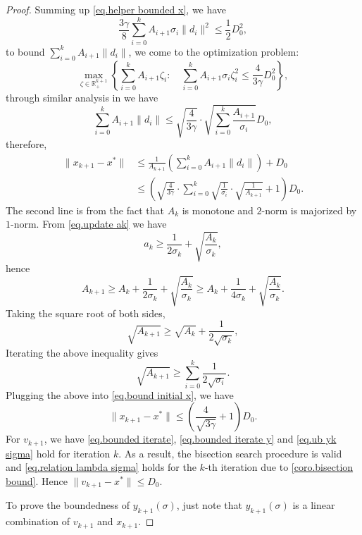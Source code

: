 \documentclass{article}
\begin{document}
\begin{proof}
    Summing up \eqref{eq.helper bounded x}, we have
    \begin{equation*}
        \frac{3\gamma}{8}\sum_{i=0}^k A_{i+1}\sigma_i \|d_i\|^2 \leq \frac{1}{2}D_0^2,
    \end{equation*}
    to bound $\sum_{i=0}^k A_{i+1}\|d_i\|$, we come to the optimization problem:
    \begin{equation*}
        \max _{\zeta \in \mathbb{R}^{k+1}_+}\left\{\sum_{i=0}^{k} A_{i+1}\zeta_i: \quad \sum_{i=0}^{k} A_{i+1} \sigma_i\zeta_i^2 \leq \frac{4}{3\gamma}D_0^2\right\},
    \end{equation*}
    through similar analysis in \citet[Lemma A.2]{monteiro2013accelerated} we have
    \begin{equation*}
        \sum_{i=0}^k A_{i+1}\|d_i\| \leq \sqrt{\frac{4}{3\gamma}}\cdot \sqrt{\sum_{i=0}^k \frac{A_{i+1}}{\sigma_i}} D_0,
    \end{equation*}
    therefore,
    \begin{equation}\label{eq.bound initial x}
        \begin{aligned}
             \|x_{k+1}-x^*\| &\leq \frac{1}{A_{k+1}}\left (\sum_{i=0}^k A_{i+1}\|d_i\|\right)+D_0\\
             &\leq \left(\sqrt{\frac{4}{3\gamma}}\cdot \sum_{i=0}^k\sqrt{\frac{1}{\sigma_i}}\cdot \sqrt{\frac{1}{A_{k+1}}} +1\right)D_0.
        \end{aligned}
    \end{equation}
    The second line is from the fact that $A_k$ is monotone and $2$-norm is majorized by $1$-norm. From \eqref{eq.update ak} we have
    \begin{equation*}
        a_k \geq \frac{1}{2\sigma_k}+\sqrt{\frac{A_k}{\sigma_k}},
    \end{equation*}
    hence
    \begin{equation*}
        A_{k+1}\geq A_k+\frac{1}{2\sigma_k}+\sqrt{\frac{A_k}{\sigma_k}}\geq A_k+\frac{1}{4\sigma_k}+\sqrt{\frac{A_k}{\sigma_k}}.
    \end{equation*}
    Taking the square root of both sides,
    \begin{equation*}
        \sqrt{A_{k+1}}\geq \sqrt{A_k}+\frac{1}{2\sqrt{\sigma_k}},
    \end{equation*}
    Iterating the above inequality gives
    \begin{equation*}
        \sqrt{A_{k+1}}\geq \sum_{i=0}^k \frac{1}{2\sqrt{\sigma_i}}.
    \end{equation*}
    Plugging the above into \eqref{eq.bound initial x}, we have
    \begin{equation*}
        \|x_{k+1}-x^*\| \leq \left( \frac{4}{\sqrt{3\gamma}}+1\right) D_0.
    \end{equation*}
    For $v_{k+1}$, we have \eqref{eq.bounded iterate}, \eqref{eq.bounded iterate y} and \eqref{eq.ub yk sigma} hold for iteration $k$. As a result, the bisection search procedure is valid and \eqref{eq.relation lambda sigma} holds for the $k$-th iteration due to \autoref{coro.bisection bound}. Hence $\|v_{k+1}-x^*\|\leq D_0$.
    
    To prove the boundedness of $y_{k+1}(\sigma)$, just note that $y_{k+1}(\sigma)$ is a linear combination of $v_{k+1}$ and $x_{k+1}$.
\end{proof}
\end{document}
